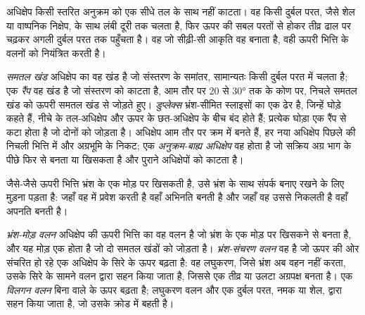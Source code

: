 अधिक्षेप किसी स्तरित अनुक्रम को एक सीधे तल के साथ नहीं काटता।
वह किसी दुर्बल परत, जैसे शेल या वाष्पनिक निक्षेप, के साथ लंबी दूरी तक चलता है, फिर
ऊपर की सबल परतों से होकर तीव्र ढाल पर चढ़कर अगली दुर्बल परत तक पहुँचता है। वह
जो सीढ़ी-सी आकृति वह बनाता है, वही ऊपरी भित्ति के वलनों को नियंत्रित करती है।

\begin{definition}[रैंप, समतल खंड, डुप्लेक्स, अनुक्रम-बाह्य अधिक्षेप]\label{def:b3:orogenic-wedges:thrust-geometry}
\emph{समतल खंड} अधिक्षेप का वह खंड है जो
संस्तरण के समांतर, सामान्यतः किसी दुर्बल परत में चलता है; एक \emph{रैंप
} वह खंड है जो संस्तरण को काटता है,
आम तौर पर 20 से \ang{30} तक के कोण पर, निचले समतल खंड को ऊपरी समतल खंड से जोड़ते हुए।
\emph{डुप्लेक्स} भ्रंश-सीमित स्लाइसों का एक ढेर है,
जिन्हें घोड़े कहते हैं, नीचे के तल-अधिक्षेप और
ऊपर के छत-अधिक्षेप के बीच बंद होते हैं; प्रत्येक घोड़ा एक रैंप से कटा होता है जो दोनों को जोड़ता है। अधिक्षेप आम तौर पर
क्रम में बनते हैं, हर नया अधिक्षेप पिछले की निचली भित्ति में और
अग्रभूमि के निकट; एक \emph{अनुक्रम-बाह्य अधिक्षेप} वह होता है जो
सक्रिय अग्र भाग के पीछे फिर से बनता या खिसकता है और पुराने अधिक्षेपों को काटता है।
\end{definition}

जैसे-जैसे ऊपरी भित्ति भ्रंश के एक मोड़ पर खिसकती है, उसे भ्रंश के साथ संपर्क बनाए रखने के लिए
मुड़ना पड़ता है: जहाँ वह  में प्रवेश करती है वहाँ अभिनति बनती है और
जहाँ वह उससे निकलती है वहाँ अपनति बनती है।

\begin{definition}\label{def:b3:orogenic-wedges:thrust-folds}
\emph{भ्रंश-मोड़ वलन} अधिक्षेप की ऊपरी भित्ति का वह वलन है जो
भ्रंश के एक मोड़ पर खिसकने से बनता है, और यह मोड़ एक  होता है
जो दो समतल खंडों को जोड़ता है। \emph{भ्रंश-संचरण वलन} वह है जो
ऊपर की ओर संचरित हो रहे एक अधिक्षेप के सिरे के ऊपर बढ़ता है: वह
लघुकरण, जिसे भ्रंश अब वहन नहीं करता, उसके सिरे के सामने वलन द्वारा
सहन किया जाता है, जिससे एक तीव्र या उलटा अग्रपक्ष बनता है। एक \emph{विलगन
वलन} बिना  वाले  के ऊपर बढ़ता है; लघुकरण
वलन और एक दुर्बल परत, नमक या शेल, द्वारा सहन किया जाता है, जो
उसके क्रोड में बहती है।
\end{definition}

